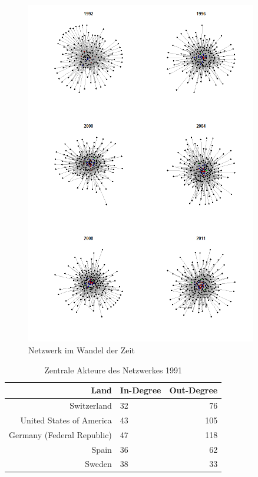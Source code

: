 \documentclass[a4paper,ngerman,oneside,titlepage,bibliography=totoc,11pt]{scrreprt}
\begin{document}
\begin{figure}[h]
	\centering
		\includegraphics[width=0.90\textwidth]{Grafiken/ts_network.png}
	\caption{Netzwerk im Wandel der Zeit}
	\label{fig:ts_network}
\end{figure}



\begin{table}[h]
\centering
\footnotesize
\begin{tabular}{rlr}
  \hline
 Land 											& In-Degree & Out-Degree\\ 
  \hline
 Switzerland 								& 32				& 76\\ 
 United States of America 	& 43				& 105\\ 
 Germany (Federal Republic) & 47				& 118\\ 
 Spain 											& 36				& 62\\ 
 Sweden 										& 38 				& 33\\ 
 

   \hline
\end{tabular}
\caption{Zentrale Akteure des Netzwerkes 1991} 
\label{top_1991}
	\end{table}
	
\end{document}
